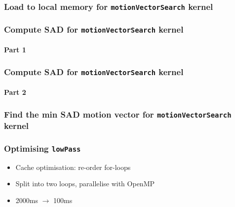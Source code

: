 \begin{frame}
  \frametitle{Load to local memory for \lstinline{motionVectorSearch}
    kernel}
  \begin{exampleblock}{}
    
    {\color{red} }
  \end{exampleblock}
\end{frame}

\begin{frame}
  \frametitle{Compute SAD for \lstinline{motionVectorSearch} kernel}
  \framesubtitle{Part 1}
  \begin{exampleblock}{}
    
    \qquad {}
    
  \end{exampleblock}
\end{frame}

\begin{frame}
  \frametitle{Compute SAD for \lstinline{motionVectorSearch} kernel}
  \framesubtitle{Part 2}
  \begin{exampleblock}{}
    
  \end{exampleblock}
\end{frame}

\begin{frame}
  \frametitle{Find the min SAD motion vector for
    \lstinline{motionVectorSearch} kernel}
  \begin{exampleblock}{}
    
  \end{exampleblock}
\end{frame}

\begin{frame}
  \frametitle{Optimising \lstinline{lowPass}}

  \begin{itemize}
  \item Cache optimisation: re-order for-loops
  \item Split into two loops, parallelise with OpenMP
  \item 2000ms $\to$ 100ms
  \end{itemize}

\end{frame}


